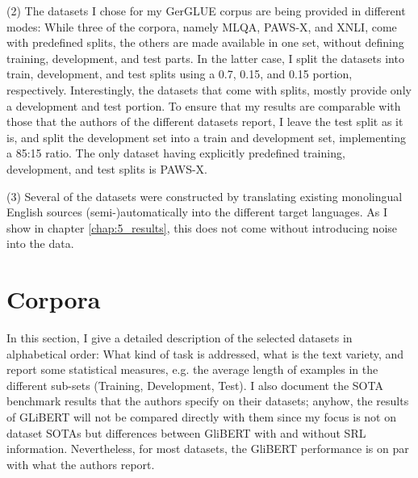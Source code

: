 (2) The datasets I chose for my GerGLUE corpus are being provided in different modes: While
three of the corpora, namely MLQA, PAWS-X, and XNLI, come with predefined splits, the others
are made available in one set, without defining training, development, and test parts. In
the latter case, I split the datasets into train, development, and test splits using a 0.7,
0.15, and 0.15 portion, respectively. Interestingly, the datasets that come with splits,
mostly provide only a development and test portion. To ensure that my results are comparable
with those that the authors of the different datasets report, I leave the test split as it
is, and split the development set into a train and development set, implementing a 85:15
ratio. The only dataset having explicitly predefined training, development, and test splits
is PAWS-X.

(3) Several of the datasets were constructed by translating existing monolingual English sources
(semi-)automatically into the different target languages. As I show in chapter \ref{chap:5_results},
this does not come without introducing noise into the data.





\section{Corpora}

In this section, I give a detailed description of the selected datasets in alphabetical order:
What kind of task is addressed, what is the text variety, and report some statistical measures,
e.g. the average length of examples in the different sub-sets (Training, Development, Test). I
also document the SOTA benchmark results that the authors specify on their datasets; anyhow,
the results of GLiBERT will not be compared directly with them since my focus is not on dataset
SOTAs but differences between GliBERT with and without SRL information. Nevertheless, for most
datasets, the GliBERT performance is on par with what the authors report.



